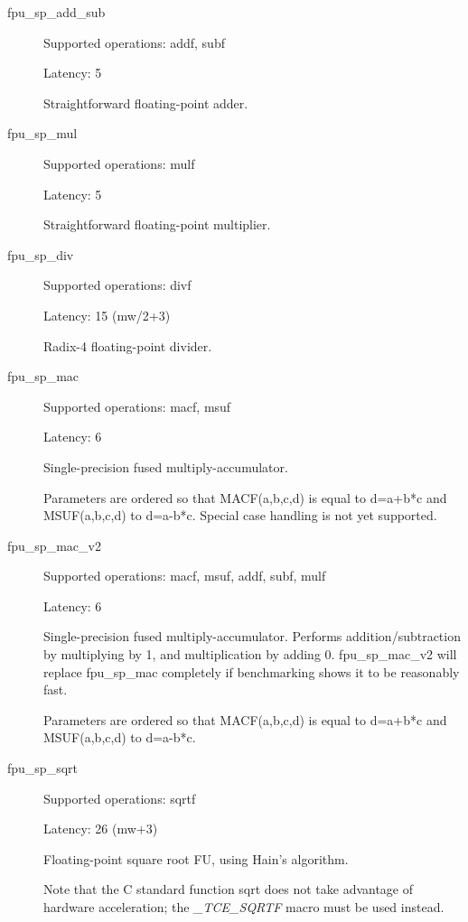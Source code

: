\documentclass[twoside]{tceusermanual}
\begin{document}
\begin{description}
 \item[fpu\_sp\_add\_sub]

Supported operations: addf, subf

Latency: 5

Straightforward floating-point adder.

 \item[fpu\_sp\_mul]

Supported operations:         mulf

Latency:             5

Straightforward floating-point multiplier.

\item[fpu\_sp\_div]

Supported operations:         divf

Latency:             15 (mw/2+3)

Radix-4 floating-point divider.

\item[fpu\_sp\_mac]

Supported operations:         macf, msuf

Latency:             6

Single-precision fused multiply-accumulator.

Parameters are ordered so that MACF(a,b,c,d) is equal to d=a+b*c and MSUF(a,b,c,d) to d=a-b*c. Special case handling is not yet supported.

\item[fpu\_sp\_mac\_v2]

Supported operations:         macf, msuf, addf, subf, mulf

Latency:             6

Single-precision fused multiply-accumulator. Performs addition/subtraction by multiplying by 1,
and multiplication by adding 0. fpu\_sp\_mac\_v2 will replace fpu\_sp\_mac completely if benchmarking shows it
to be reasonably fast.

Parameters are ordered so that MACF(a,b,c,d) is equal to d=a+b*c and MSUF(a,b,c,d) to d=a-b*c.

\item[fpu\_sp\_sqrt]

Supported operations:         sqrtf

Latency:             26 (mw+3)

Floating-point square root FU, using Hain's algorithm.

Note that the C standard function sqrt does not take advantage of hardware acceleration; the
\emph{\_TCE\_SQRTF} macro must be used instead.


\end{description}
\end{document}
